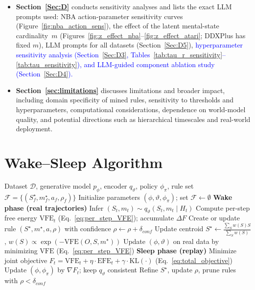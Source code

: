 \documentclass{article} %
\newcommand{\revise}[1]{\textcolor{blue}{#1}}
\begin{document}
\begin{itemize}
  \item \textbf{Section~\ref{Sec:D}} conducts sensitivity analyses and lists the exact LLM prompts used: 
  NBA action-parameter sensitivity curves (Figure~\ref{fig:nba_action_sens}), 
  the effect of the latent mental-state cardinality~$m$ (Figures~\ref{fig:z_effect_nba}--\ref{fig:z_effect_atari}; 
  DDXPlus has fixed $m$), LLM prompts for all datasets (Section~\ref{Sec:D5}), 
  \revise{hyperparameter sensitivity analysis (Section~\ref{Sec:D3}, Tables~\ref{tab:tau_r_sensitivity}--\ref{tab:tau_sensitivity}), 
  and LLM-guided component ablation study (Section~\ref{Sec:D4}).}

  \item \textbf{Section~\ref{sec:limitations}} discusses limitations and broader impact, 
  including domain specificity of mined rules, sensitivity to thresholds and hyperparameters, 
  computational considerations, dependence on world-model quality, and potential directions such as 
  hierarchical timescales and real-world deployment.
\end{itemize}



\section{Wake–Sleep Algorithm}
\label{Sec:A}

\begin{algorithm}[ht]
\caption{Rule-Guided Active Inference: Unified Wake–Sleep Cycle}
\label{alg:rule-guided-active-inference}
\begin{algorithmic}[1]
\Require Dataset $\mathcal D$, generative model $p_{\phi}$, encoder $q_{\vartheta}$, policy $\phi_{\pi}$, rule set $\mathcal F=\{(S_f^\star,m_f^\star,a_f,\rho_f)\}$
\State Initialize parameters $(\phi,\vartheta,\phi_{\pi})$; set $\mathcal F\leftarrow\emptyset$
  \State \textbf{Wake phase (real trajectories)}
      \State Infer $(S_t,m_t)\sim q_{\vartheta}(S_t,m_t\mid H_t)$
      \State Compute per-step free energy $\mathrm{VFE}_t$ (Eq.~\ref{eq:per_step_VFE}); accumulate $\Delta F$
        \State Create or update rule $(S^\star,m^\star,a,\rho)$ with confidence $\rho\gets\rho+\delta_{conf}$
        \State Update centroid $S^\star \gets \frac{\sum_{S} w(S)S}{\sum_{S} w(S)}$, $w(S)\!\propto\!\exp(-\mathrm{VFE}(O,S,m^\star))$
      \EndIf
    \EndFor
  \EndFor
  \State Update $(\phi,\vartheta)$ on real data by minimizing $\mathrm{VFE}$ (Eq.~\ref{eq:per_step_VFE})
  \Statex
  \State \textbf{Sleep phase (replay)}
    \State Minimize joint objective $F_t=\mathrm{VFE}_t+\eta\cdot\mathrm{EFE}_t+\gamma\cdot\mathrm{KL}(\cdot)$ (Eq.~\ref{eq:total_objective})
    \State Update $(\phi,\phi_{\pi})$ by $\nabla F_t$; keep $q_{\vartheta}$ consistent
    \State Refine $S^\star$, update $\rho$, prune rules with $\rho<\delta_{conf}$
  \EndFor
\EndFor
\end{algorithmic}
\end{algorithm}
\end{document}
